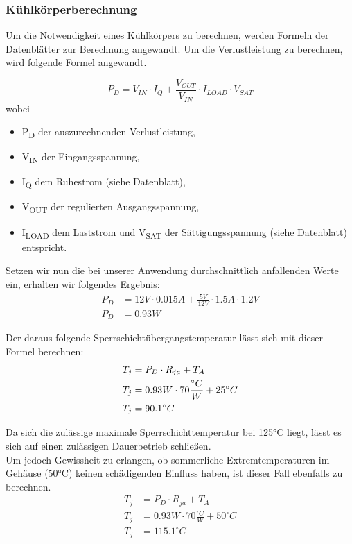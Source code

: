 \subsubsection{Kühlkörperberechnung}

Um die Notwendigkeit eines Kühlkörpers zu berechnen, werden Formeln der Datenblätter zur Berechnung angewandt.
Um die Verlustleistung zu berechnen, wird folgende Formel angewandt.

\begin{equation}
    P_D = V_{IN} \cdot I_Q + \frac{V_{OUT}}{V_{IN}} \cdot I_{LOAD} \cdot V_{SAT}
\end{equation}
wobei
\begin{itemize}
    \item P\textsubscript{D} der auszurechnenden Verlustleistung,
    \item V\textsubscript{IN} der Eingangsspannung,
    \item I\textsubscript{Q} dem Ruhestrom (siehe Datenblatt),
    \item V\textsubscript{OUT} der regulierten Ausgangsspannung,
    \item I\textsubscript{LOAD} dem Laststrom und V\textsubscript{SAT} der Sättigungsspannung (siehe Datenblatt) entspricht.
\end{itemize}

Setzen wir nun die bei unserer Anwendung durchschnittlich anfallenden Werte ein, erhalten wir folgendes Ergebnis:
\begin{align*}
    P_D &= 12V \cdot 0.015A + \frac{5V}{12V} \cdot 1.5A \cdot 1.2V \\
    P_D &= 0.93W
\end{align*}

Der daraus folgende Sperrschichtübergangstemperatur lässt sich mit dieser Formel berechnen:
\begin{align}
    T_j &= P_D \cdot R_{ja} + T_A\\
    T_j &= 0.93W \cdot 70\frac{{}^{\circ}C}{W} + 25^{\circ}C \notag \\
    T_j &= 90.1^{\circ}C \notag
\end{align}

Da sich die zulässige maximale Sperrschichttemperatur bei 125°C liegt, lässt es sich auf einen zulässigen Dauerbetrieb schließen.\\
Um jedoch Gewissheit zu erlangen, ob sommerliche Extremtemperaturen im Gehäuse (50°C) keinen schädigenden Einfluss haben, ist dieser Fall ebenfalls zu berechnen.
\begin{align*}
    T_j &= P_D \cdot R_{ja} + T_A\\
    T_j &= 0.93W \cdot 70\frac{{}^{\circ}C}{W} + 50^{\circ}C \\
    T_j &= 115.1^{\circ}C
\end{align*}

